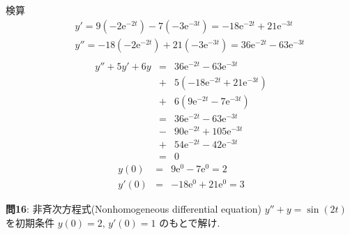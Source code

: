 ﻿\documentclass[a4j]{jarticle}
\begin{document}
検算
\begin{eqnarray*}
&\,& y'  = 9(-2\mathrm{e}^{-2t}) - 7 (-3\mathrm{e}^{-3t}) = -18\mathrm{e}^{-2t} + 21 \mathrm{e}^{-3t} \\
&\,& y'' = -18(-2\mathrm{e}^{-2t}) + 21(-3\mathrm{e}^{-3t}) = 36\mathrm{e}^{-2t} - 63\mathrm{e}^{-3t} \\
\end{eqnarray*}
\begin{eqnarray*}
y''+5y'+6y &=& 36\mathrm{e}^{-2t} - 63\mathrm{e}^{-3t} \\
           &+& 5(-18\mathrm{e}^{-2t} + 21 \mathrm{e}^{-3t}) \\
           &+& 6(9\mathrm{e}^{-2t} - 7 \mathrm{e}^{-3t}) \\
           &=& 36\mathrm{e}^{-2t} - 63\mathrm{e}^{-3t} \\
           &-& 90\mathrm{e}^{-2t} + 105\mathrm{e}^{-3t} \\
           &+& 54\mathrm{e}^{-2t} - 42 \mathrm{e}^{-3t} \\
           &=& 0
\end{eqnarray*}
\begin{eqnarray*}
 y(0) &=& 9\mathrm{e}^{0} - 7 \mathrm{e}^{0} = 2 \\
y'(0) &=& -18\mathrm{e}^{0} + 21 \mathrm{e}^{0} = 3
\end{eqnarray*}

\noindent
\large{\bf{問16}}: 非斉次方程式(Nonhomogeneous differential equation) \(y''+y=\sin(2t) \) を初期条件 \( y(0)=2 ,\, y'(0)=1 \) のもとで解け.
\end{document}
